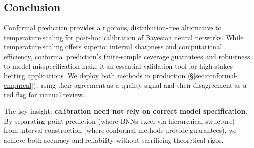 \subsection{Conclusion}

Conformal prediction provides a rigorous, distribution-free alternative to temperature scaling for post-hoc calibration of Bayesian neural networks. While temperature scaling offers superior interval sharpness and computational efficiency, conformal prediction's finite-sample coverage guarantees and robustness to model misspecification make it an essential validation tool for high-stakes betting applications. We deploy both methods in production (\S\ref{sec:conformal-empirical}), using their agreement as a quality signal and their disagreement as a red flag for manual review.

The key insight: \textbf{calibration need not rely on correct model specification}. By separating point prediction (where BNNs excel via hierarchical structure) from interval construction (where conformal methods provide guarantees), we achieve both accuracy and reliability without sacrificing theoretical rigor.
